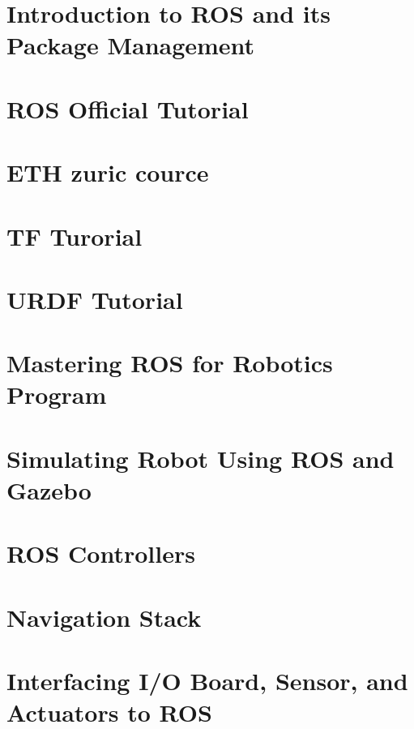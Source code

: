 \documentclass[11pt]{report}
\begin{document}
\tableofcontents

\chapter{Introduction to ROS and its Package Management}


\chapter{ROS Official Tutorial}


\chapter{ETH zuric cource}


\chapter{TF Turorial}


\chapter{URDF Tutorial}


\chapter{Mastering ROS for Robotics Program}


\chapter{Simulating Robot Using ROS and Gazebo}


\chapter{ROS Controllers}


\chapter{Navigation Stack}


\chapter{Interfacing I/O Board, Sensor, and Actuators to ROS}

\end{document}
